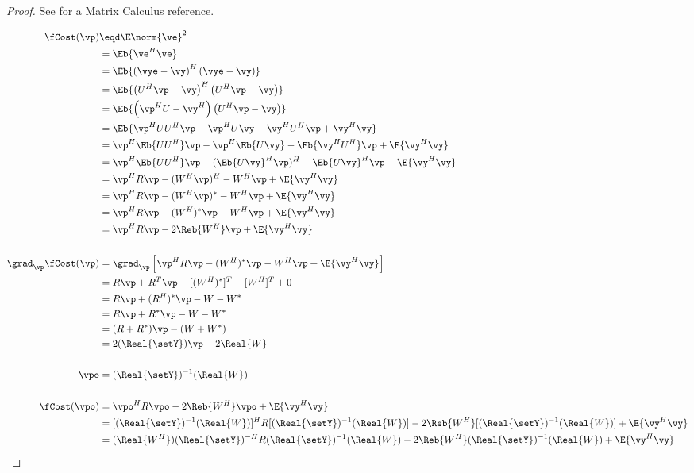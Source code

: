 \begin{proof}
See  for a Matrix Calculus reference.

\begin{align*}
   \fCost(\vp)
     &\eqd \E \norm{\ve}^2
   \\&=    \Eb{\ve^H\ve}
   \\&=    \Eb{ \left(\vye-\vy\right)^H\left(\vye-\vy\right) }
   \\&=    \Eb{ \left(U^H\vp-\vy\right)^H\left(U^H\vp-\vy\right) }
   \\&=    \Eb{ \left(\vp^HU-\vy^H\right)\left(U^H\vp-\vy\right) }
   \\&=    \Eb{ \vp^HUU^H\vp - \vp^HU\vy -\vy^HU^H\vp + \vy^H\vy }
   \\&=    \vp^H\Eb{UU^H}\vp - \vp^H\Eb{U\vy} -\Eb{\vy^HU^H}\vp + \E{\vy^H\vy}
   \\&=    \vp^H\Eb{UU^H}\vp - (\Eb{U\vy}^H\vp)^H -\Eb{U\vy}^H\vp + \E{\vy^H\vy}
   \\&=    \vp^H R \vp - (W^H\vp)^H -W^H\vp + \E{\vy^H\vy}
   \\&=    \vp^H R \vp - (W^H\vp)^\ast -W^H\vp + \E{\vy^H\vy}
   \\&=    \vp^H R \vp - (W^H)^\ast\vp -W^H\vp + \E{\vy^H\vy}
   \\&=    \vp^H R \vp - 2\Reb{W^H}\vp + \E{\vy^H\vy}
\\
\\
   \grad_\vp \fCost(\vp)
     &= \grad_\vp \left[ \vp^H R \vp - (W^H)^\ast\vp -W^H\vp + \E{\vy^H\vy} \right]
   \\&= R\vp + R^T\vp - [(W^H)^\ast]^T - [W^H]^T + 0
   \\&= R\vp + (R^H)^\ast\vp - W - W^\ast
   \\&= R\vp + R^\ast\vp - W - W^\ast
   \\&= (R + R^\ast)\vp - (W + W^\ast)
   \\&= 2(\Real{\setY})\vp - 2\Real{W}
\\
\\
   \vpo
     &= (\Real{\setY})^{-1}(\Real{W})
\\
\\
   \fCost(\vpo)
     &=    \vpo^H R \vpo - 2\Reb{W^H}\vpo + \E{\vy^H\vy}
   \\&=    [(\Real{\setY})^{-1}(\Real{W})]^H R [(\Real{\setY})^{-1}(\Real{W})] - 2\Reb{W^H}[(\Real{\setY})^{-1}(\Real{W})] + \E{\vy^H\vy}
   \\&=    (\Real{W^H})(\Real{\setY})^{-H} R (\Real{\setY})^{-1}(\Real{W}) - 2\Reb{W^H}(\Real{\setY})^{-1}(\Real{W}) + \E{\vy^H\vy}

\end{align*}
\end{proof}
